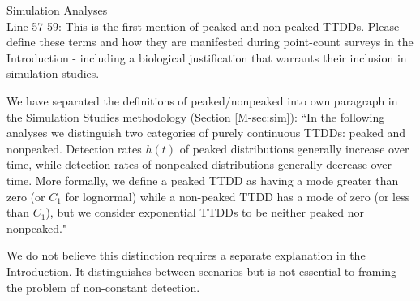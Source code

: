 \documentclass[12pt]{article}
\renewenvironment{quote}  %
              {\list{}{\rightmargin\leftmargin}\normalfont%
               \item\relax}
              {\endlist}
\begin{document}
Simulation Analyses\\
Line 57-59: This is the first mention of peaked and non-peaked TTDDs.  Please define these terms and how they are manifested during point-count surveys in the Introduction - including a biological justification that warrants their inclusion in simulation studies.
\begin{quote}
We have separated the definitions of peaked/nonpeaked into own paragraph in the Simulation Studies methodology (Section \ref{M-sec:sim}):
``In the following analyses we distinguish two categories of purely continuous TTDDs: peaked and nonpeaked.  
Detection rates $h(t)$ of peaked distributions generally increase over time, while detection rates of nonpeaked distributions generally decrease over time.
More formally, we define a peaked TTDD as having a mode greater than zero (or $C_1$ for lognormal) while a non-peaked TTDD has a mode of zero (or less than $C_1$), but we consider exponential TTDDs to be neither peaked nor nonpeaked."

We do not believe this distinction requires a separate explanation in the Introduction.  It distinguishes between scenarios but is not essential to framing the problem of non-constant detection.
\end{quote}
\end{document}
